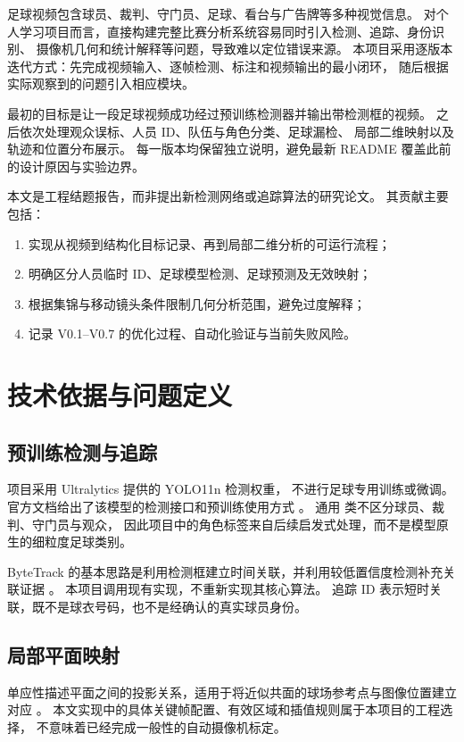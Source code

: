 \documentclass[UTF8,fontset=fandol,11pt,a4paper]{ctexart}
\newcommand{\code}[1]{\texttt{\detokenize{#1}}}
\begin{document}
足球视频包含球员、裁判、守门员、足球、看台与广告牌等多种视觉信息。
对个人学习项目而言，直接构建完整比赛分析系统容易同时引入检测、追踪、身份识别、
摄像机几何和统计解释等问题，导致难以定位错误来源。
本项目采用逐版本迭代方式：先完成视频输入、逐帧检测、标注和视频输出的最小闭环，
随后根据实际观察到的问题引入相应模块。

最初的目标是让一段足球视频成功经过预训练检测器并输出带检测框的视频。
之后依次处理观众误标、人员 ID、队伍与角色分类、足球漏检、
局部二维映射以及轨迹和位置分布展示。
每一版本均保留独立说明，避免最新 README 覆盖此前的设计原因与实验边界。

本文是工程结题报告，而非提出新检测网络或追踪算法的研究论文。
其贡献主要包括：
\begin{enumerate}
  \item 实现从视频到结构化目标记录、再到局部二维分析的可运行流程；
  \item 明确区分人员临时 ID、足球模型检测、足球预测及无效映射；
  \item 根据集锦与移动镜头条件限制几何分析范围，避免过度解释；
  \item 记录 V0.1--V0.7 的优化过程、自动化验证与当前失败风险。
\end{enumerate}

\section{技术依据与问题定义}

\subsection{预训练检测与追踪}
项目采用 Ultralytics 提供的 YOLO11n 检测权重，
不进行足球专用训练或微调。官方文档给出了该模型的检测接口和预训练使用方式
\cite{yolo11}。
通用 \code{person} 类不区分球员、裁判、守门员与观众，
因此项目中的角色标签来自后续启发式处理，而不是模型原生的细粒度足球类别。

ByteTrack 的基本思路是利用检测框建立时间关联，并利用较低置信度检测补充关联证据
\cite{bytetrack}。
本项目调用现有实现，不重新实现其核心算法。
追踪 ID 表示短时关联，既不是球衣号码，也不是经确认的真实球员身份。

\subsection{局部平面映射}
单应性描述平面之间的投影关系，适用于将近似共面的球场参考点与图像位置建立对应
\cite{opencv}。
本文实现中的具体关键帧配置、有效区域和插值规则属于本项目的工程选择，
不意味着已经完成一般性的自动摄像机标定。
\end{document}
